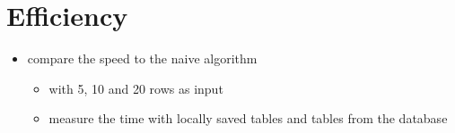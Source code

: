 \section{Efficiency}
\begin{itemize}
  \item compare the speed to the naive algorithm
        \begin{itemize}
          \item with 5, 10 and 20 rows as input
          \item measure the time with locally saved tables and tables from the database
        \end{itemize}
\end{itemize}